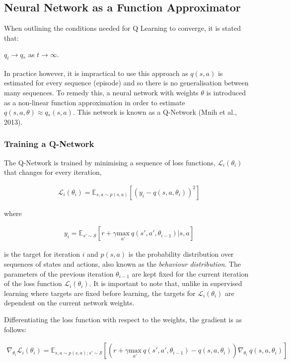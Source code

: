 \documentclass{article}
\begin{document}
\newpage
\subsection{Neural Network as a Function Approximator}


When outlining the conditions needed for Q Learning to converge, it is stated that: 

$q_t \xrightarrow[]{} q_*$ as $t \xrightarrow[]{} \infty$. 


In practice however, it is impractical to use this approach as $q(s,a)$ is estimated for every sequence (episode) and so there is no generalisation between many sequences. To remedy this, a neural network with weights $\theta$ is introduced as a non-linear function approximation in order to estimate $q(s, a, \theta) \approx q_*(s,a)$. This network is known as a Q-Network (Mnih et al., 2013).  


\subsubsection{Training a Q-Network}

The Q-Network is trained by minimising a sequence of loss functions, $\mathcal{L}_i(\theta_i)$ that changes for every iteration,

\begin{align}
    \mathcal{L}_i(\theta_i) = \mathbb{E}_{s,a \sim p(s,a)} \left[ (y_i - q(s,a, \theta_i))^2 \right]
\end{align}

where 

\begin{align}
    y_i = \mathbb{E}_{s' \sim \mathcal{S}} \left[r + \gamma \underset{a'}{\text{max}}\ q(s', a', \theta_{i-1})|s,a \right]    
\end{align}

is the target for iteration $i$ and $p(s,a)$ is the probability distribution over sequences of states and actions, also known as the \textit{behaviour distribution}. The parameters of the previous iteration $\theta_{i-1}$ are kept fixed for the current iteration of the loss function $\mathcal{L}_i(\theta_i)$. It is important to note that, unlike in supervised learning where targets are fixed before learning, the targets for $\mathcal{L}_i(\theta_i)$ are dependent on the current network weights. 

Differentiating the loss function with respect to the weights, the gradient is as follows: 

\begin{align}
    \nabla_{\theta_i} \mathcal{L}_i (\theta_i) = \mathbb{E}_{s,a \sim p(s,a);s' \sim \mathcal{S}} \left[ (r + \gamma \underset{a'}{\text{max}}\ q(s', a', \theta_{i-1}) - q(s,a,\theta_i)) \nabla_{\theta_i}\ q(s,a,\theta_i) \right]
\end{align}
\end{document}
